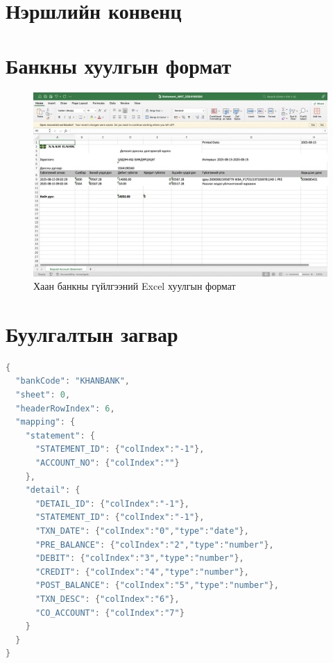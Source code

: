
\appendix
{}

\chapter{Нэршлийн конвенц}


\chapter{Банкны хуулгын формат}
\begin{figure}[H]
	\centering
	\includegraphics[width=15cm]{images/excel.png}
	\caption{Хаан банкны гүйлгээний Excel хуулгын формат}
	\label{fig:excel}
\end{figure}

\chapter{Буулгалтын загвар}

\begin{lstlisting}[language=Java, caption=Хаан банкны гүйлгээний Excel хуулгын форматын буулгалтын загвар=single]
{
  "bankCode": "KHANBANK",
  "sheet": 0,
  "headerRowIndex": 6,
  "mapping": {
    "statement": {
      "STATEMENT_ID": {"colIndex":"-1"},
      "ACCOUNT_NO": {"colIndex":""}
    },
    "detail": {
      "DETAIL_ID": {"colIndex":"-1"},
      "STATEMENT_ID": {"colIndex":"-1"},
      "TXN_DATE": {"colIndex":"0","type":"date"},
      "PRE_BALANCE": {"colIndex":"2","type":"number"},
      "DEBIT": {"colIndex":"3","type":"number"},
      "CREDIT": {"colIndex":"4","type":"number"},
      "POST_BALANCE": {"colIndex":"5","type":"number"},
      "TXN_DESC": {"colIndex":"6"},
      "CO_ACCOUNT": {"colIndex":"7"}
    }
  }
}
\end{lstlisting}
